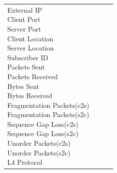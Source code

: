 \begin{description}
\begin{longtable}{p{}|p{}|p{}|p{}}
{                                                                                                    External IP\\
                                                                                                    Client Port\\
                                                                                                    Server Port\\
                                                                                                    Client Location\\
                                                                                                    Server Location\\
                                                                                                    Subscriber ID\\
                                                                                                    Packets Sent\\
                                                                                                    Packets Received\\
                                                                                                    Bytes Sent\\
                                                                                                    Bytes Received\\
                                                                                                    Fragmentation Packets(c2s)\\
                                                                                                    Fragmentation Packets(s2c)\\
                                                                                                    Sequence Gap Loss(c2s)\\
                                                                                                    Sequence Gap Loss(s2c)\\
                                                                                                    Unorder Packets(c2s)\\
                                                                                                    Unorder Packets(s2c)\\
                                                                                                    L4 Protocol\\
}
\end{longtable}
\end{description}

